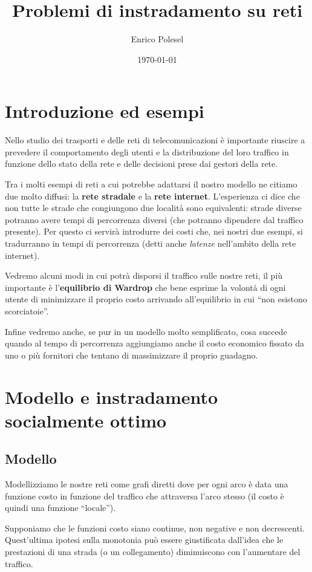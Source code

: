 \documentclass[a4paper]{article}
\title{Problemi di instradamento su reti}
\date{\today}
\author{Enrico Polesel}
\theoremstyle{plain}
\theoremstyle{definition}
\theoremstyle{remark}
\begin{document}
\maketitle

\section{Introduzione ed esempi}

Nello studio dei trasporti e delle reti di telecomunicazioni è
importante riuscire a prevedere il comportamento degli utenti e la
distribuzione del loro traffico in funzione dello stato della rete e
delle decisioni prese dai gestori della rete.

Tra i molti esempi di reti a cui potrebbe adattarsi il nostro modello
ne citiamo due molto diffusi: la \textbf{rete stradale} e la
\textbf{rete internet}. L'esperienza ci dice che non tutte le strade
che congiungono due località sono equivalenti: strade diverse potranno
avere tempi di percorrenza diversi (che potranno dipendere dal
traffico presente). Per questo ci servirà introdurre dei costi che,
nei nostri due esempi, si tradurranno in tempi di percorrenza (detti
anche \textit{latenze} nell'ambito della rete internet).

Vedremo alcuni modi in cui potrà disporsi il traffico sulle nostre
reti, il più importante è l'\textbf{equilibrio di Wardrop} che bene
esprime la volontà di ogni utente di minimizzare il proprio costo
arrivando all'equilibrio in cui ``non esistono scorciatoie''.

Infine vedremo anche, se pur in un modello molto semplificato, cosa
succede quando al tempo di percorrenza aggiungiamo anche il costo
economico fissato da uno o più fornitori che tentano di massimizzare
il proprio guadagno.

\section{Modello e instradamento socialmente ottimo}

\subsection{Modello}

Modellizziamo le nostre reti come grafi diretti dove per ogni arco è
data una funzione costo in funzione del traffico che attraversa l'arco
stesso (il costo è quindi una funzione ``locale'').

Supponiamo che le funzioni costo siano continue, non negative e non
decrescenti. Quest'ultima ipotesi sulla monotonia può essere
giustificata dall'idea che le prestazioni di una strada (o un
collegamento) diminuiscono con l'aumentare del traffico.
\end{document}
